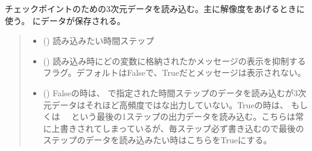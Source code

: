 \documentclass[letterpaper,10pt,dvipdfmx,report]{sphinxmanual}
\begin{document}
\begin{fulllineitems}
\label{\detokenize{io:R2D2.R2D2_data.read_qq_check}}
\pysigstartsignatures
{}
\pysigstopsignatures
\sphinxAtStartPar
チェックポイントのための3次元データを読み込む。主に解像度をあげるときに使う。 {\hyperref[\detokenize{io:R2D2.R2D2_data.qc}]{}} にデータが保存される。
\begin{quote}\begin{description}
\begin{itemize}
\item {} 
\sphinxAtStartPar
{} () \sphinxhyphen{}\sphinxhyphen{} 読み込みたい時間ステップ

\item {} 
\sphinxAtStartPar
{} () \sphinxhyphen{}\sphinxhyphen{} 読み込み時にどの変数に格納されたかメッセージの表示を抑制するフラグ。デフォルトはFalseで、Trueだとメッセージは表示されない。

\item {} 
\sphinxAtStartPar
{} () \sphinxhyphen{}\sphinxhyphen{} Falseの時は、  で指定された時間ステップのデータを読み込むが3次元データはそれほど高頻度ではな出力していない。Trueの時は、  もしくは　 という最後の1ステップの出力データを読み込む。こちらは常に上書きされてしまっているが、毎ステップ必ず書き込むので最後のステップのデータを読み込みたい時はこちらをTrueにする。

\end{itemize}

\end{description}\end{quote}

\end{fulllineitems}

\end{document}
